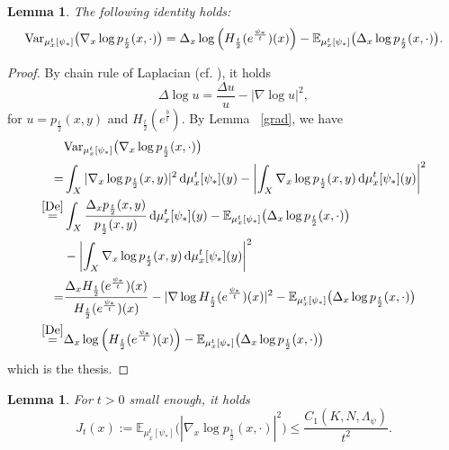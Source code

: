 \documentclass[a4paper,11pt]{article}
\numberwithin{equation}{section}
\theoremstyle{plain}
\newtheorem{lemma}[theorem]{Lemma}
\theoremstyle{definition}
\theoremstyle{remark}
\renewcommand{\d}{{\mathrm d}}
\begin{document}
	\begin{lemma}\label{Lemma3.6}
		The following identity holds: 
		\begin{equation}
			{\rm{Var}}_{ \mu_x^t[\psi_*]}\big(\nabla_x \log p_\frac{t}{2}(x,\cdot)\big)= \Delta_x \log \left(H_\frac{t}{2}(e^\frac{\psi_*}{t})(x)\right) - \mathbb{E}_{\mu_x^t[\psi_*]}\big(\Delta_x \log p_{\frac{t}{2}}(x, \cdot)\big).
		\end{equation}
	\end{lemma}
	\begin{proof}
		By chain rule of Laplacian (cf. \cite[Theorem 5.2.3]{zbMATH07183685}), it holds
	\begin{equation}\label{De}
	\Delta\log u=\frac{\Delta u}{u}-|\nabla \log u|^2,
	\end{equation}
	for $u=p_\frac{t}{2}(x,y)$ and $H_\frac{t}{2}(e^\frac{b}{t})$. By Lemma~ \ref{grad},  we have
	\begin{equation}
		\begin{aligned}
		&{\rm{Var}}_{ \mu_x^t[\psi_*]}\big(\nabla_x \log p_\frac{t}{2}(x,\cdot)\big)\\
		=&\int_X |\nabla_x \log p_\frac{t}{2}(x,y)|^2\,\d\mu_x^t[\psi_*](y)-\left|\int_X \nabla_x \log p_\frac{t}{2}(x,y)\,\d\mu_x^t[\psi_*](y)\right|^2\\
		\mathop{=}^{\eqref{De}}&\int_X \frac{\Delta_x p_\frac{t}{2}(x,y)}{ p_\frac{t}{2}(x,y)}\,\d\mu_x^t[\psi_*](y)-\mathbb{E}_{\mu_x^t[\psi_*]}\big(\Delta_x \log p_{\frac{t}{2}}(x, \cdot)\big)\\
		&-\left|\int_X \nabla_x \log p_\frac{t}{2}(x,y)\,\d\mu_x^t[\psi_*](y)\right|^2\\
		=&\frac{\Delta_x H_\frac{t}{2}(e^\frac{\psi_*}{t})(x)}{H_\frac{t}{2}(e^\frac{\psi_*}{t})(x)}-|\nabla \log H_\frac{t}{2}(e^\frac{\psi_*}{t})(x)|^2- \mathbb{E}_{\mu_x^t[\psi_*]}\big(\Delta_x \log p_{\frac{t}{2}}(x, \cdot)\big)\\
		\mathop{=}^{\eqref{De}}&\Delta_x \log \left(H_\frac{t}{2}(e^\frac{\psi_*}{t})(x)\right)  - \mathbb{E}_{\mu_x^t[\psi_*]}\big(\Delta_x \log p_{\frac{t}{2}}(x, \cdot)\big)
		\end{aligned}
	\end{equation}
	which is the thesis.
	\end{proof}
	
	
	\begin{lemma}\label{p3.7}
		For $t>0$ small enough,  it holds 
		\begin{equation}
			J_t(x):=\mathbb{E}_{\mu_x^t[\psi_*]}\big(|\nabla_x \log p_\frac{t}{2}(x,\cdot)|^2\big)\leq \frac{C_1(K,N, \Lambda_\psi)}{t^2}.
		\end{equation} 
	\end{lemma}
	
\end{document}

